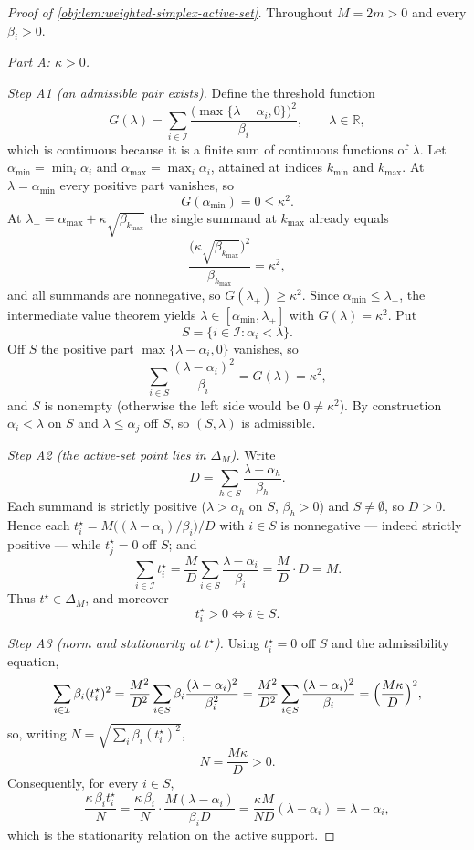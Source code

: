 \documentclass[11pt]{article}
\begin{document}
\begin{proof}[Proof of \cref{obj:lem:weighted-simplex-active-set}]
Throughout \(M=2m>0\) and every \(\beta_i>0\).

\emph{Part A: \(\kappa>0\).}

\emph{Step A1 (an admissible pair exists).}  Define the threshold function
\[
G(\lambda)=\sum_{i\in\mathcal I}\frac{\bigl(\max\{\lambda-\alpha_i,0\}\bigr)^2}{\beta_i},
\qquad\lambda\in\mathbb R,
\]
which is continuous because it is a finite sum of continuous functions of \(\lambda\).  Let \(\alpha_{\min}=\min_i\alpha_i\) and \(\alpha_{\max}=\max_i\alpha_i\), attained at indices \(k_{\min}\) and \(k_{\max}\).  At \(\lambda=\alpha_{\min}\) every positive part vanishes, so
\[
G(\alpha_{\min})=0\le\kappa^2 .
\]
At \(\lambda_{+}=\alpha_{\max}+\kappa\sqrt{\beta_{k_{\max}}}\) the single summand at \(k_{\max}\) already equals
\[
\frac{\bigl(\kappa\sqrt{\beta_{k_{\max}}}\bigr)^2}{\beta_{k_{\max}}}=\kappa^2,
\]
and all summands are nonnegative, so \(G(\lambda_{+})\ge\kappa^2\).  Since \(\alpha_{\min}\le\lambda_{+}\), the intermediate value theorem yields \(\lambda\in[\alpha_{\min},\lambda_{+}]\) with \(G(\lambda)=\kappa^2\).  Put
\[
S=\{i\in\mathcal I:\alpha_i<\lambda\}.
\]
Off \(S\) the positive part \(\max\{\lambda-\alpha_i,0\}\) vanishes, so
\[
\sum_{i\in S}\frac{(\lambda-\alpha_i)^2}{\beta_i}=G(\lambda)=\kappa^2 ,
\]
and \(S\) is nonempty (otherwise the left side would be \(0\ne\kappa^2\)).  By construction \(\alpha_i<\lambda\) on \(S\) and \(\lambda\le\alpha_j\) off \(S\), so \((S,\lambda)\) is admissible. %

\emph{Step A2 (the active-set point lies in \(\Delta_M\)).}  Write
\[
D=\sum_{h\in S}\frac{\lambda-\alpha_h}{\beta_h}.
\]
Each summand is strictly positive (\(\lambda>\alpha_h\) on \(S\), \(\beta_h>0\)) and \(S\ne\emptyset\), so \(D>0\).  Hence each \(t_i^\star=M\bigl((\lambda-\alpha_i)/\beta_i\bigr)/D\) with \(i\in S\) is nonnegative --- indeed strictly positive --- while \(t_j^\star=0\) off \(S\); and
\[
\sum_{i\in\mathcal I}t_i^\star
=\frac{M}{D}\sum_{i\in S}\frac{\lambda-\alpha_i}{\beta_i}
=\frac{M}{D}\cdot D=M .
\]
Thus \(t^\star\in\Delta_M\), and moreover
\[
t_i^\star>0\iff i\in S .
\]

\emph{Step A3 (norm and stationarity at \(t^\star\)).}  Using \(t_i^\star=0\) off \(S\) and the admissibility equation,
\[
\sum_{i\in\mathcal I}\beta_i(t_i^\star)^2
=\frac{M^2}{D^2}\sum_{i\in S}\beta_i\frac{(\lambda-\alpha_i)^2}{\beta_i^2}
=\frac{M^2}{D^2}\sum_{i\in S}\frac{(\lambda-\alpha_i)^2}{\beta_i}
=\Bigl(\frac{M\kappa}{D}\Bigr)^2 ,
\]
so, writing \(N=\sqrt{\sum_i\beta_i(t_i^\star)^2}\),
\[
N=\frac{M\kappa}{D}>0 .
\]
Consequently, for every \(i\in S\),
\[
\frac{\kappa\,\beta_i t_i^\star}{N}
=\frac{\kappa\,\beta_i}{N}\cdot\frac{M(\lambda-\alpha_i)}{\beta_iD}
=\frac{\kappa M}{ND}(\lambda-\alpha_i)
=\lambda-\alpha_i ,
\]
which is the stationarity relation on the active support.


\end{proof}
\end{document}
